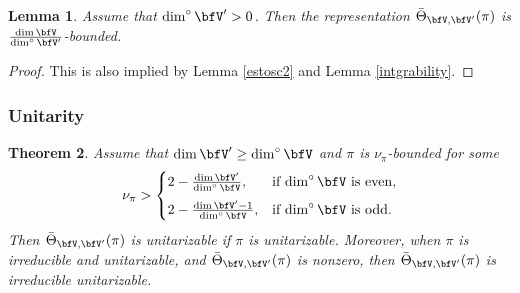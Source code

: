 \documentclass[12pt,a4paper]{amsart}
\numberwithin{equation}{section}
\newtheorem{thm}{Theorem}[section]
\newtheorem{lem}[thm]{Lemma}
\theoremstyle{remark}
\def\abfV{\bfV'}
\def\dimo{\dim^\circ}
\def\Thetab{\bar{\Theta}}
\begin{document}
\begin{lem}\label{intpi2}
Assume that $\dimo \abfV>0$. Then the representation
$\Thetab_{\bfV,\abfV}(\pi)$ is $\frac{\dim \bfV}{\dimo \abfV}$-bounded.
\end{lem}
\begin{proof}
This is also implied by Lemma \ref{estosc2} and Lemma \ref{intgrability}.
\end{proof}

\subsubsection{Unitarity}


\begin{thm}\label{positivity0}
Assume that $\dim \abfV\geq \dimo \bfV$ and $\pi$ is  $\nu_\pi$-bounded for some
\[
  \nu_\pi>\begin{cases}
    2-\frac{\dim \abfV}{\dimo \bfV},&\text{if $\dimo \bfV$ is even,}\medskip\\
    2-\frac{\dim \abfV-1}{\dimo \bfV}, &\text{if $\dimo \bfV$ is odd.}
  \end{cases}
\]
Then $\Thetab_{\bfV,\abfV}(\pi)$ is unitarizable if  $\pi$ is unitarizable.
Moreover, when $\pi$ is irreducible and unitarizable, and $\Thetab_{\bfV,\abfV}(\pi)$ is nonzero,
then $\Thetab_{\bfV,\abfV}(\pi)$ is irreducible unitarizable.
\end{thm}
\end{document}
